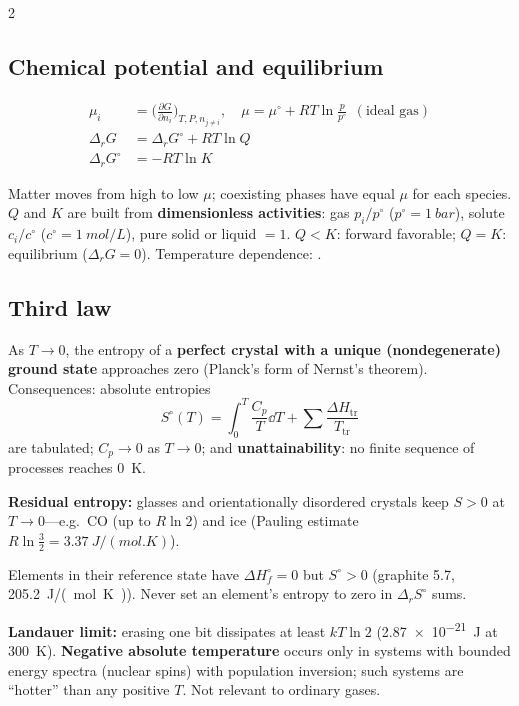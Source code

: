 \begin{multicols}{2}
\subsection{Chemical potential and equilibrium}\label{sec:chempot}
\begin{formulabox}
\vspace{-6pt}
\begin{align}
\mu_i &= \Big(\frac{\partial G}{\partial n_i}\Big)_{T,P,n_{j\ne i}},\quad \mu=\mu^\circ+RT\ln\frac{p}{p^\circ}\ \ (\text{ideal gas}) \label{F:entropy:mu}\\
\Delta_rG &= \Delta_rG^\circ+RT\ln Q \label{F:entropy:dGQ}\\
\Delta_rG^\circ &= -RT\ln K \label{F:entropy:K}
\end{align}
\end{formulabox}
Matter moves from high to low $\mu$; coexisting phases have equal $\mu$ for each species. $Q$ and $K$ are built from \textbf{dimensionless activities}: gas $p_i/p^\circ$ ($p^\circ=\SI{1}{bar}$), solute $c_i/c^\circ$ ($c^\circ=\SI{1}{mol/L}$), pure solid or liquid $=1$. $Q<K$: forward favorable; $Q=K$: equilibrium ($\Delta_rG=0$). Temperature dependence: .

\subsection{Third law}\label{sec:thirdlaw}
\CORE{} As $T\to0$, the entropy of a \textbf{perfect crystal with a unique (nondegenerate) ground state} approaches zero (Planck's form of Nernst's theorem). Consequences: absolute entropies
\begin{equation}
S^\circ(T)=\int_0^T\frac{C_p}{T}\dd T+\sum\frac{\Delta H_{\text{tr}}}{T_{\text{tr}}} \label{F:entropy:absolute}
\end{equation}
are tabulated; $C_p\to0$ as $T\to0$; and \textbf{unattainability}: no finite sequence of processes reaches \SI{0}{K}.

\textbf{Residual entropy:} glasses and orientationally disordered crystals keep $S>0$ at $T\to0$---e.g.\ CO (up to $R\ln2$) and ice (Pauling estimate $R\ln\tfrac32=\SI{3.37}{J/(mol.K)}$).

\begin{trapbox}Elements in their reference state have $\Delta H_f^\circ=0$ but $S^\circ>0$ (graphite \num{5.7},  \SI{205.2}{J/(mol.K)}). Never set an element's entropy to zero in $\Delta_rS^\circ$ sums.\end{trapbox}

\EXT{} \textbf{Landauer limit:} erasing one bit dissipates at least $kT\ln2$ (\SI{2.87e-21}{J} at \SI{300}{K}). \textbf{Negative absolute temperature} occurs only in systems with bounded energy spectra (nuclear spins) with population inversion; such systems are ``hotter'' than any positive $T$. Not relevant to ordinary gases.
\end{multicols}
